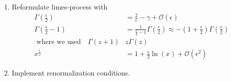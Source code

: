 \begin{enumerate}
	\item Reformulate limes-process with
	\begin{align}
		\Gamma(\frac{\epsilon}{2}) &= \frac{2}{\epsilon} - \gamma + \mathcal{O}(\epsilon) \\
		\Gamma(\frac{\epsilon}{2} -1) &= \frac{1}{\frac{\epsilon}{2}-1} \Gamma(\frac{\epsilon}{2}) \approx - (1+\frac{\epsilon}{2}) \Gamma(\frac{\epsilon}{2}) \\
		\text{ where we used} \quad \Gamma(z+1) &z \Gamma(z) \nonumber\\
		x^{\frac{\epsilon}{2}} &= 1 + \frac{\epsilon}{2} \ln(x)+ \mathcal{O}(\epsilon^2)
	\end{align}
\item Implement renormalization conditions.
\end{enumerate}



